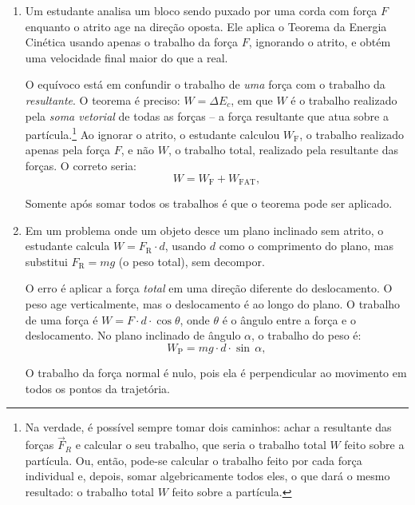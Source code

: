 \begin{enumerate}
    \item [(i)] Um estudante analisa um bloco sendo puxado por uma corda com força $F$ enquanto o
atrito age na direção oposta. Ele aplica o Teorema da Energia Cinética usando apenas o
trabalho da força $F$, ignorando o atrito, e obtém uma velocidade final maior do que a real.

O equívoco está em confundir o trabalho de \emph{uma} força com o trabalho da
\emph{resultante}. O teorema é preciso: $W = \Delta E_c$, em que $W$ é o
trabalho realizado pela \emph{soma vetorial} de todas as forças -- a força resultante que atua sobre a partícula.\footnote{Na verdade, é possível sempre tomar dois caminhos: achar a resultante das forças $\vec F_R$ e calcular o seu trabalho, que seria o trabalho total $W$ feito sobre a partícula. Ou, então, pode-se calcular o trabalho feito por cada força individual e, depois, somar algebricamente todos eles, o que dará o mesmo resultado: o trabalho total $W$ feito sobre a partícula.} Ao ignorar o atrito, o
estudante calculou $W_\text{F}$, o trabalho realizado apenas pela força $F$, e não $W$, o trabalho total, realizado pela resultante das forças. O correto seria:
%
\begin{equation*}
    W = W_\text{F} + W_\text{FAT},
\end{equation*}
%

Somente após somar todos os trabalhos é que o teorema pode ser aplicado.


    \item [(ii)] Em um problema onde um objeto desce um plano inclinado sem atrito, o estudante
calcula $W = F_\text{R} \cdot d$, usando $d$ como o comprimento do plano, mas
substitui $F_\text{R} = mg$ (o peso total), sem decompor.

O erro é aplicar a força \emph{total} em uma direção diferente do deslocamento. O peso age
verticalmente, mas o deslocamento é ao longo do plano. O trabalho de uma força é
$W = F \cdot d \cdot \cos\theta$, onde $\theta$ é o ângulo entre a força e o
deslocamento. No plano inclinado de ângulo $\alpha$, o trabalho do peso é:
%
\begin{equation*}
    W_\text{P} = mg \cdot d \cdot \sin\,\alpha,
\end{equation*}
%

O trabalho da força normal é nulo, pois ela é perpendicular ao movimento em todos os pontos da trajetória.
\end{enumerate}




